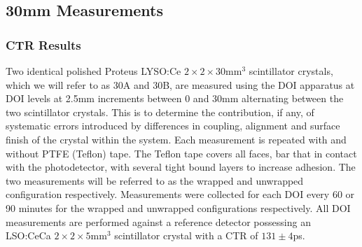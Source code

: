 \subsection{30mm Measurements}
\subsubsection{CTR Results}
Two identical polished Proteus LYSO:Ce $2\times2\times30$mm$^3$ scintillator crystals, which we will refer to as 30A and 30B, are measured using the DOI apparatus at DOI levels at 2.5mm increments between 0 and 30mm alternating between the two scintillator crystals. This is to determine the contribution, if any, of systematic errors introduced by differences in coupling, alignment and surface finish of the crystal within the system. Each measurement is repeated with and without PTFE (Teflon) tape. The Teflon tape covers all faces, bar that in contact with the photodetector, with several tight bound layers to increase adhesion. The two measurements will be referred to as the wrapped and unwrapped configuration respectively. Measurements were collected for each DOI every 60 or 90 minutes for the wrapped and unwrapped configurations respectively. All DOI measurements are performed against a reference detector possessing an LSO:CeCa $2\times2\times5$mm$^3$ scintillator crystal with a CTR of $131\pm4$ps.

